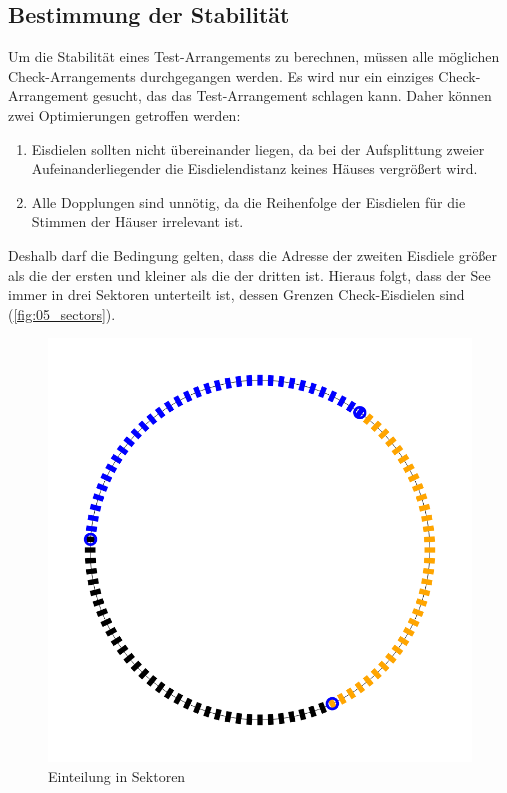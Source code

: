 \documentclass[a4paper,10pt,ngerman,captions=figureheading]{scrartcl}
\newcommand{\imageWidth}{0.3\linewidth}
\begin{document}
\subsection{Bestimmung der Stabilität}
\label{sec:Bestimmung_der_Stabilität}
Um die Stabilität eines Test-Arrangements zu berechnen, müssen alle möglichen Check-Arrangements durchgegangen werden.
Es wird nur ein einziges Check-Arrangement gesucht, das das Test-Arrangement schlagen kann.
Daher können zwei Optimierungen getroffen werden:
\begin{enumerate}
    \item Eisdielen sollten nicht übereinander liegen, da bei der Aufsplittung zweier Aufeinanderliegender die Eisdielendistanz keines Häuses vergrößert wird.
    \item Alle Dopplungen sind unnötig, da die Reihenfolge der Eisdielen für die Stimmen der Häuser irrelevant ist.
\end{enumerate}
Deshalb darf die Bedingung gelten, dass die Adresse der zweiten Eisdiele größer als die der ersten und kleiner als die der dritten ist.
Hieraus folgt, dass der See immer in drei Sektoren unterteilt ist, dessen Grenzen Check-Eisdielen sind (\autoref{fig:05_sectors}).

\begin{figure}[h!t]
    \centering
    \caption{Einteilung in Sektoren}
    \label{fig:05_sectors}
    \includegraphics[width=\imageWidth]{05_sectors.png}
\end{figure}
\end{document}
